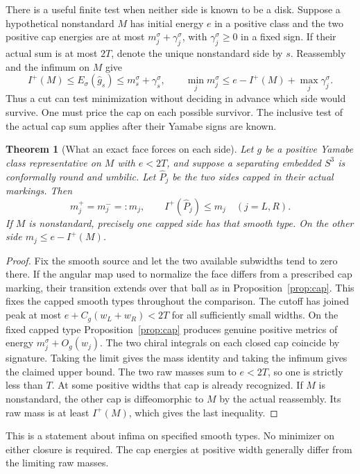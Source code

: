 \documentclass[11pt,letterpaper]{article}
\numberwithin{equation}{section}
\newtheorem{theorem}[proposition]{Theorem}
\begin{document}
There is a useful finite test when neither side is known to be a
disk. Suppose a hypothetical nonstandard \(M\) has initial energy
\(e\) in a positive class and the two positive cap energies are at
most \(m_j^\sigma+\gamma_j^\sigma\), with
\(\gamma_j^\sigma\ge0\) in a fixed sign. If their actual sum is at
most \(2T\), denote the unique nonstandard side by \(s\). Reassembly
and the infimum on \(M\) give
\[
 I^+(M)\le E_\sigma(\widehat g_s)\le m_s^\sigma+\gamma_s^\sigma,
 \qquad
 \min_j m_j^\sigma\le e-I^+(M)+\max_j\gamma_j^\sigma .
\]
Thus a cut can test minimization without deciding in advance which
side would survive. One must price the cap on each possible survivor.
The inclusive test of the actual cap sum applies after their Yamabe
signs are known.

\begin{theorem}[What an exact face forces on each side]\label{thm:mass}
Let \(g\) be a positive Yamabe class representative on \(M\) with
\(e<2T\), and suppose a separating embedded \(S^3\) is conformally
round and umbilic. Let \(\widehat P_j\) be the two sides capped in
their actual markings. Then
\[
 m_j^+=m_j^-=:m_j,\qquad I^+(\widehat P_j)\le m_j\quad(j=L,R).
\]
If \(M\) is nonstandard, precisely one capped side has that smooth
type. On the other side \(m_j\le e-I^+(M)\).
\end{theorem}
\begin{proof}
Fix the smooth source and let the two available subwidths tend to
zero there. If the angular map used to normalize the face differs
from a prescribed cap marking, their transition extends over that
ball as in Proposition~\ref{prop:cap}. This fixes the capped smooth
types throughout the comparison. The cutoff has joined peak at most
\(e+C_g(w_L+w_R)<2T\) for all sufficiently small widths. On the
fixed capped type Proposition~\ref{prop:cap} produces genuine positive
metrics of energy \(m_j^\sigma+O_g(w_j)\). The two chiral integrals
on each closed cap coincide by signature. Taking the limit gives
the mass identity and taking the infimum gives the claimed upper
bound. The two raw masses sum to \(e<2T\), so one is strictly less
than \(T\). At some positive widths that cap is already recognized.
If \(M\) is nonstandard, the other cap is diffeomorphic to \(M\)
by the actual reassembly. Its raw mass is at least \(I^+(M)\), which
gives the last inequality.
\end{proof}
This is a statement about infima on specified smooth types. No
minimizer on either closure is required. The cap energies at positive
width generally differ from the limiting raw masses.
\end{document}
